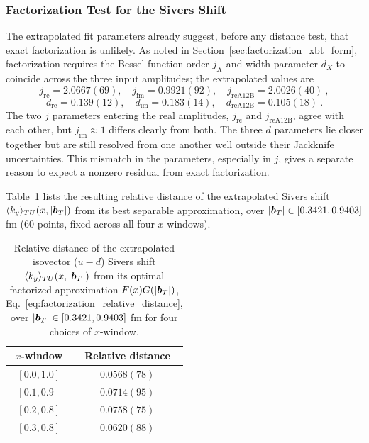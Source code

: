 \subsubsection{Factorization Test for the Sivers Shift}
\label{sec:factorization_sivers_test}

The extrapolated fit parameters already suggest, before any distance test, that exact factorization is unlikely. As noted in Section~\ref{sec:factorization_xbt_form}, factorization requires the Bessel-function order $j_X$ and width parameter $d_X$ to coincide across the three input amplitudes; the extrapolated values are
\begin{equation}
    j_{\text{re}} = 2.0667(69), \quad j_{\text{im}} = 0.9921(92), \quad j_{\text{reA12B}} = 2.0026(40) \ ,
\end{equation}
\begin{equation}
    d_{\text{re}} = 0.139(12), \quad d_{\text{im}} = 0.183(14), \quad d_{\text{reA12B}} = 0.105(18) \ .
\end{equation}
The two $j$ parameters entering the real amplitudes, $j_{\text{re}}$ and $j_{\text{reA12B}}$, agree with each other, but $j_{\text{im}} \approx 1$ differs clearly from both. The three $d$ parameters lie closer together but are still resolved from one another well outside their Jackknife uncertainties. This mismatch in the parameters, especially in $j$, gives a separate reason to expect a nonzero residual from exact factorization.

Table~\ref{tab:factorization_sivers} lists the resulting relative distance of the extrapolated Sivers shift $\langle k_y \rangle_{TU}(x,|\boldsymbol{b}_T|)$ from its best separable approximation, over $|\boldsymbol{b}_T| \in [0.3421,0.9403]$ fm (60 points, fixed across all four $x$-windows).

\begin{table}[H]
    \centering
    \renewcommand{\arraystretch}{1.4}
    \caption{Relative distance of the extrapolated isovector ($u-d$) Sivers shift $\langle k_y \rangle_{TU}(x,|\boldsymbol{b}_T|)$ from its optimal factorized approximation $F(x)G(|\boldsymbol{b}_T|)$, Eq.~\eqref{eq:factorization_relative_distance}, over $|\boldsymbol{b}_T| \in [0.3421, 0.9403]$ fm for four choices of $x$-window.}
    \label{tab:factorization_sivers}
    \begin{tabular}{|c|c|}
    \hline
    $x$-window & Relative distance \\
    \hline
    $[0.0,1.0]$ & $0.0568(78)$ \\
    \hline
    $[0.1,0.9]$ & $0.0714(95)$ \\
    \hline
    $[0.2,0.8]$ & $0.0758(75)$ \\
    \hline
    $[0.3,0.8]$ & $0.0620(88)$ \\
    \hline
    \end{tabular}
\end{table}

